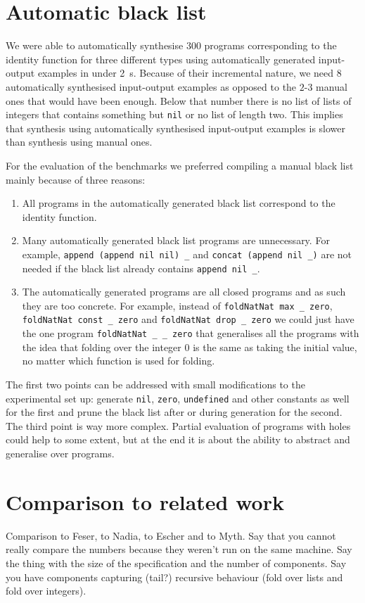 \section{Automatic black list}\label{Automatic black list}
We were able to automatically synthesise $300$ programs corresponding to the identity function for three different types using automatically generated input-output examples in under \SI{2}{s}. Because of their incremental nature, we need $8$ automatically synthesised input-output examples as opposed to the $2$-$3$ manual ones that would have been enough. Below that number there is no list of lists of integers that contains something but \lstinline?nil? or no list of length two. This implies that synthesis using automatically synthesised input-output examples is slower than synthesis using manual ones.

For the evaluation of the benchmarks we preferred compiling a manual black list mainly because of three reasons: 
\begin{enumerate}
\item All programs in the automatically generated black list correspond to the identity function.
\item Many automatically generated black list programs are unnecessary. For example, \lstinline?append (append nil nil) _? and \lstinline?concat (append nil _)? are not needed if the black list already contains \lstinline?append nil _?.
\item The automatically generated programs are all closed programs and as such they are too concrete. For example, instead of \lstinline?foldNatNat max _ zero?, \lstinline?foldNatNat const _ zero? and \lstinline?foldNatNat drop _ zero? we could just have the one program \lstinline?foldNatNat _ _ zero? that generalises all the programs with the idea that folding over the integer $0$ is the same as taking the initial value, no matter which function is used for folding.
\end{enumerate}

The first two points can be addressed with small modifications to the experimental set up: generate \lstinline?nil?, \lstinline?zero?, \lstinline?undefined? and other constants as well for the first and prune the black list after or during generation for the second.
The third point is way more complex. Partial evaluation of programs with holes could help to some extent, but at the end it is about the ability to abstract and generalise over programs.

\section{Comparison to related work}
Comparison to Feser, to Nadia, to Escher and to Myth. Say that you cannot really compare the numbers because they weren't run on the same machine. Say the thing with the size of the specification and the number of components. Say you have components capturing (tail?) recursive behaviour (fold over lists and fold over integers).


